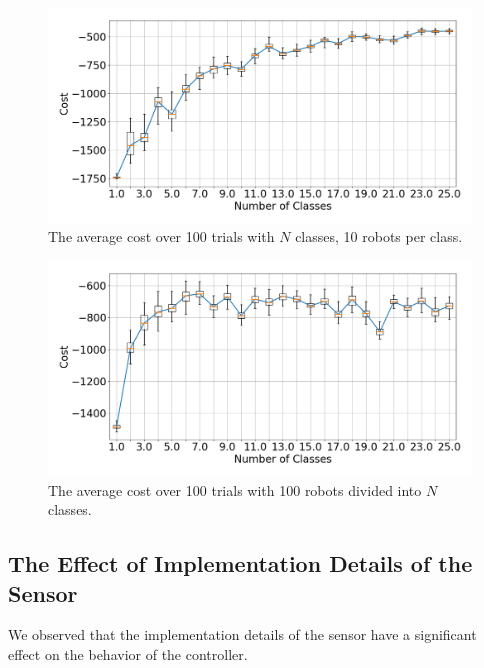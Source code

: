 \documentclass[letterpaper, 10 pt, conference]{ieeeconf}
\begin{document}
\begin{figure}[t]
  \centering
  \includegraphics[width=1\linewidth]{./images/num_classes_vs_cost_10_per_class.png}
  \caption{The average cost over 100 trials with $N$ classes, 10 robots per class.}
  \label{fig:num_classes_10}
\end{figure}

\begin{figure}[t]
  \centering
  \includegraphics[width=1\linewidth]{./images/num_classes_vs_cost_100_robots.png}
  \caption{The average cost over 100 trials with 100 robots divided into $N$ classes.}
  \label{fig:num_classes_100}
\end{figure}

\subsection{The Effect of Implementation Details of the Sensor} \label{section:sensor_impl}

We observed that the implementation details of the sensor have a significant
effect on the behavior of the controller.
\end{document}
